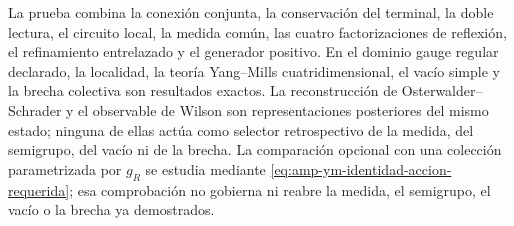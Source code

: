 La prueba combina la conexión conjunta, la conservación del terminal, la
doble lectura, el circuito local, la medida común, las cuatro factorizaciones
de reflexión, el refinamiento entrelazado y el generador positivo. En el
dominio gauge regular declarado, la
localidad, la teoría Yang--Mills cuatridimensional, el vacío simple y la
brecha colectiva son resultados exactos. La reconstrucción de
Osterwalder--Schrader y el observable de Wilson son
representaciones posteriores del mismo estado; ninguna de ellas actúa como
selector retrospectivo de la medida, del semigrupo, del vacío ni de la
brecha. La comparación opcional con una colección parametrizada por \(g_R\) se estudia
mediante \eqref{eq:amp-ym-identidad-accion-requerida}; esa comprobación no
gobierna ni reabre la medida, el semigrupo, el vacío o la brecha ya
demostrados.

